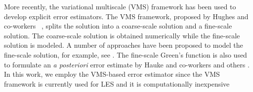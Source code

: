 More recently, the variational multiscale (VMS) framework has been used to develop explicit error estimators. 
The VMS framework, proposed by Hughes and co-workers ~\cite{hughes1995multiscale,hughes1998variational}, splits the solution into a coarse-scale solution and a fine-scale solution. 
The coarse-scale solution is obtained numerically while the fine-scale solution is modeled. 
A number of approaches have been proposed to model the fine-scale solution, for example, see \cite{brezzi1997b,brezzi1992relationship,brezzi1994choosing,codina2002stabilized,hughes2007variational,principe2010stabilization}. 
The fine-scale Green's function is also used to formulate an \textit{a posteriori} error estimate by Hauke and co-workers \cite{hauke2006proper,hauke2006multiscale,hauke2008variational,hauke2012mesh,hauke2014recent,hauke2015variational,irisarri2016posteriori} and others \cite{bayona2018variational}.
In this work, we employ the VMS-based error estimator
since the VMS framework is currently used for LES and it is computationally inexpensive




